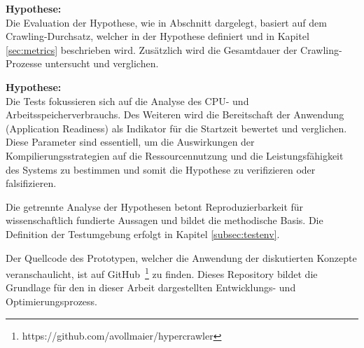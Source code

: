 \textbf{Hypothese: }\\
Die Evaluation der Hypothese, wie in Abschnitt \textit{} dargelegt, basiert auf dem Crawling-Durchsatz, welcher in der Hypothese definiert und in Kapitel \ref{sec:metrics} beschrieben wird. Zusätzlich wird die Gesamtdauer der Crawling-Prozesse untersucht und verglichen.

\textbf{Hypothese: }\\
Die Tests fokussieren sich auf die Analyse des CPU- und Arbeitsspeicherverbrauchs. Des Weiteren wird die Bereitschaft der Anwendung (Application Readiness) als Indikator für die Startzeit bewertet und verglichen. Diese Parameter sind essentiell, um die Auswirkungen der Kompilierungsstrategien auf die Ressourcennutzung und die Leistungsfähigkeit des Systems zu bestimmen und somit die Hypothese zu verifizieren oder falsifizieren.


Die getrennte Analyse der Hypothesen betont Reproduzierbarkeit für wissenschaftlich fundierte Aussagen und bildet die methodische Basis. Die Definition der Testumgebung erfolgt in Kapitel \ref{subsec:testenv}.

Der Quellcode des Prototypen, welcher die Anwendung der diskutierten Konzepte veranschaulicht, ist auf GitHub~\footnote{https://github.com/avollmaier/hypercrawler} zu finden. Dieses Repository bildet die Grundlage für den in dieser Arbeit dargestellten Entwicklungs- und Optimierungsprozess.
\chapterend

